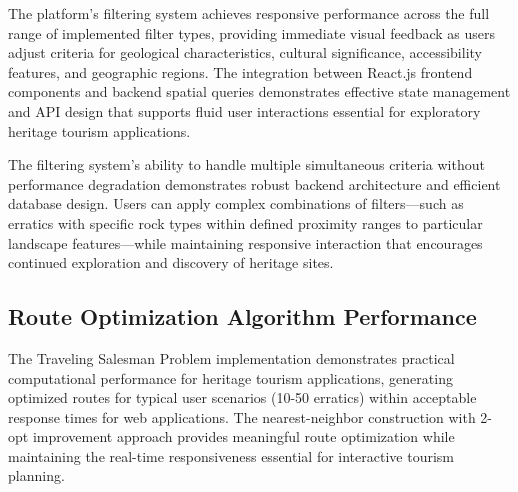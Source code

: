 The platform's filtering system achieves responsive performance across the full range of implemented filter types, providing immediate visual feedback as users adjust criteria for geological characteristics, cultural significance, accessibility features, and geographic regions. The integration between React.js frontend components and backend spatial queries demonstrates effective state management and API design that supports fluid user interactions essential for exploratory heritage tourism applications.


The filtering system's ability to handle multiple simultaneous criteria without performance degradation demonstrates robust backend architecture and efficient database design. Users can apply complex combinations of filters—such as erratics with specific rock types within defined proximity ranges to particular landscape features—while maintaining responsive interaction that encourages continued exploration and discovery of heritage sites.

\subsection{Route Optimization Algorithm Performance}
\label{subsec:route_optimization_performance}

The Traveling Salesman Problem implementation demonstrates practical computational performance for heritage tourism applications, generating optimized routes for typical user scenarios (10-50 erratics) within acceptable response times for web applications. The nearest-neighbor construction with 2-opt improvement approach provides meaningful route optimization while maintaining the real-time responsiveness essential for interactive tourism planning.


